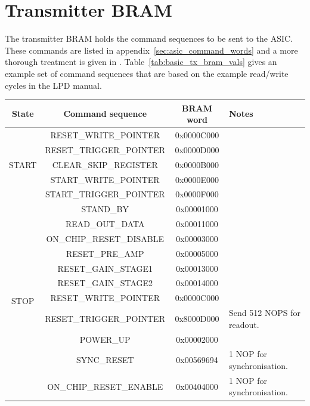 \documentclass[]{report}
\begin{document}
    \section{Transmitter BRAM} %
    \label{sub:basic_transmitter_bram}
    The transmitter BRAM holds the command sequences to be sent to the ASIC. These commands are listed in appendix~\ref{sec:asic_command_words} and a more thorough treatment is given in \cite{LPD MANUAL}. Table~\ref{tab:basic_tx_bram_vals} gives an example set of command sequences that are based on the example read/write cycles in the LPD manual\cite{LPD MANUAL}.
    \begin{table}
        \begin{center}
        \begin{tabular}{c|c|c|l}
            State & Command sequence & BRAM word & Notes \\
            \hline
            \multirow{5}{*}{START}  
              & RESET\_WRITE\_POINTER   & 0x0000C000 & \\
              & RESET\_TRIGGER\_POINTER & 0x0000D000 & \\
              & CLEAR\_SKIP\_REGISTER   & 0x0000B000 & \\
              & START\_WRITE\_POINTER   & 0x0000E000 & \\
              & START\_TRIGGER\_POINTER & 0x0000F000 & \\
            \hline
            \multirow{12}{*}{STOP} 
              & STAND\_BY                & 0x00001000 & \\
              & READ\_OUT\_DATA          & 0x00011000 & \\
              & ON\_CHIP\_RESET\_DISABLE & 0x00003000 & \\
              & RESET\_PRE\_AMP          & 0x00005000 & \\
              & RESET\_GAIN\_STAGE1      & 0x00013000 & \\
              & RESET\_GAIN\_STAGE2      & 0x00014000 & \\
              & RESET\_WRITE\_POINTER    & 0x0000C000 & \\
              & RESET\_TRIGGER\_POINTER  & 0x8000D000 & Send 512 NOPS for readout. \\
              & POWER\_UP                & 0x00002000 & \\
              & SYNC\_RESET              & 0x00569694 & 1 NOP for synchronisation. \\
              & ON\_CHIP\_RESET\_ENABLE  & 0x00404000 & 1 NOP for synchronisation. \\

\end{tabular}
\end{center}
\end{table}
\end{document}
